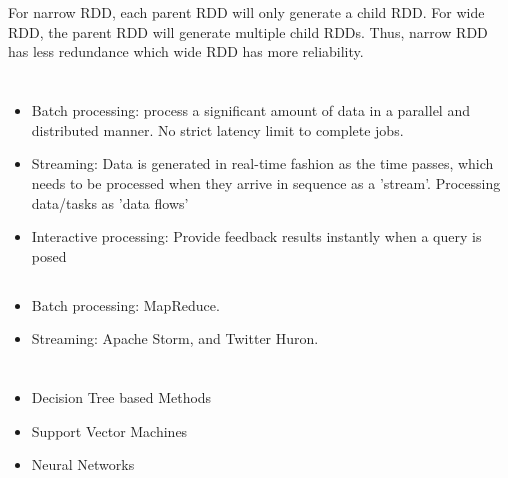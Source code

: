 \documentclass{article}
\begin{document}
    \section{}
        For narrow RDD, each parent RDD will only generate a child RDD. For wide RDD, the parent RDD will generate multiple child RDDs. Thus, narrow RDD has less redundance which wide RDD has more reliability. 
    
    \section{}
        \subsection{}
            \begin{itemize}
                \item Batch processing: process a significant amount of data in a parallel and distributed manner. No strict latency limit to complete jobs.
                \item Streaming: Data is generated in real-time fashion as the time passes, which needs to be processed when they arrive in sequence as a 'stream'. Processing data/tasks as 'data flows'
                \item Interactive processing: Provide feedback results instantly when a query is posed
            \end{itemize}
        \subsection{}
            \begin{itemize}
                \item Batch processing: MapReduce.
                \item Streaming: Apache Storm, and Twitter Huron.
            \end{itemize}
    \section{}
        \subsection{}
            \begin{itemize}
                \item Decision Tree based Methods
                \item Support Vector Machines
                \item Neural Networks
            \end{itemize}
\end{document}
